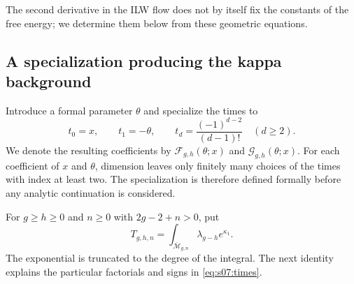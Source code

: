 \documentclass[a4paper,10pt]{article}
\numberwithin{equation}{section}
\newcommand{\MM}{\overline{\mathcal{M}}}
\theoremstyle{paperplain}
\theoremstyle{paperremark}
\theoremstyle{paperplain}
\begin{document}
The second derivative in the ILW flow
does not by itself fix the constants of the free energy; we determine
them below from these geometric equations.

\subsection{A specialization producing the kappa background}
\label{subsec:s07:02}

Introduce a formal parameter $\theta$ and specialize the times to
\begin{equation}\label{eq:s07:times}
 t_0=x,\qquad t_1=-\theta,\qquad
 t_d=\frac{(-1)^{d-2}}{(d-1)!}\quad(d\geq2).
\end{equation}
We denote the resulting coefficients by
$\mathcal F_{g,h}(\theta;x)$ and $\mathcal G_{g,h}(\theta;x)$.
For each coefficient of $x$ and $\theta$, dimension leaves only
finitely many choices of the times with index at least two.
The specialization is therefore defined formally before any analytic
continuation is considered.

For $g\geq h\geq0$ and $n\geq0$ with $2g-2+n>0$, put
\begin{equation}\label{eq:s07:kappa-integrals}
 T_{g,h,n}=\int_{\MM_{g,n}}\lambda_{g-h}e^{\kappa_1}.
\end{equation}
The exponential is truncated to the degree of the integral. The next
identity explains the particular factorials and signs in
\eqref{eq:s07:times}.
\end{document}
